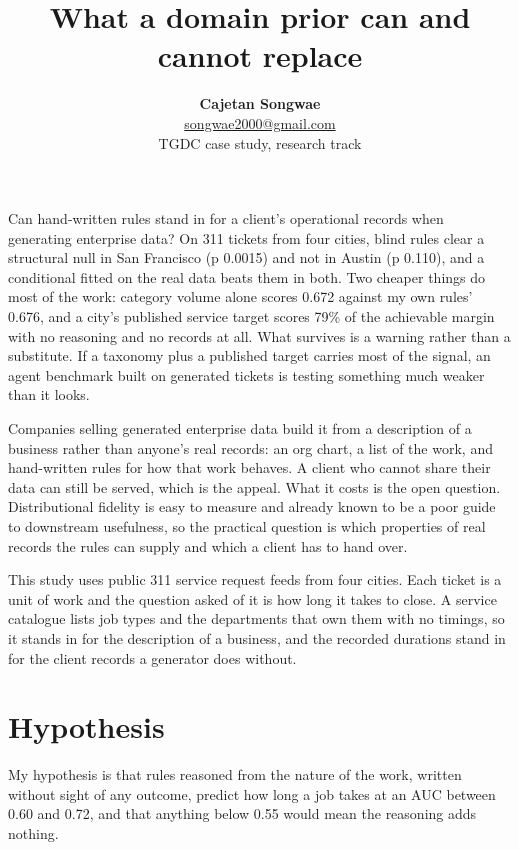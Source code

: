 \documentclass[10pt,a4paper,twocolumn]{article}
\title{\vspace{-1.0em}\textbf{What a domain prior can and cannot replace}\vspace{-0.4em}}
\author{\textbf{Cajetan Songwae} \\
  \small{\href{mailto:songwae2000@gmail.com}{songwae2000@gmail.com}} \\
  \small{TGDC case study, research track}}
\date{}
\begin{document}
\twocolumn[
  \begin{@twocolumnfalse}
  \maketitle
  \vspace{-2.0em}
  \end{@twocolumnfalse}
]

Can hand-written rules stand in for a client's operational records when
generating enterprise data? On 311 tickets from four cities, blind rules clear a
structural null in San Francisco (p 0.0015) and not in Austin (p 0.110), and a
conditional fitted on the real data beats them in both. Two cheaper things do
most of the work: category volume alone scores 0.672 against my own rules' 0.676,
and a city's published service target scores 79\% of the achievable margin with no
reasoning and no records at all. What survives is a warning rather than a
substitute. If a taxonomy plus a published target carries most of the signal, an
agent benchmark built on generated tickets is testing something much weaker than
it looks.

Companies selling generated enterprise data build it from a description of a
business rather than anyone's real records: an org chart, a list of the work, and
hand-written rules for how that work behaves. A client who cannot share their
data can still be served, which is the appeal. What it costs is the open
question. Distributional fidelity is easy to measure and already known to be a
poor guide to downstream usefulness, so the practical question is which
properties of real records the rules can supply and which a client has to hand
over.

This study uses public 311 service request feeds from four cities. Each ticket is
a unit of work and the question asked of it is how long it takes to close. A
service catalogue lists job types and the departments that own them with no
timings, so it stands in for the description of a business, and the recorded
durations stand in for the client records a generator does without.

\section*{Hypothesis}

My hypothesis is that rules reasoned from the nature of the work, written
without sight of any outcome, predict how long a job takes at an AUC between
0.60 and 0.72, and that anything below 0.55 would mean the reasoning adds
nothing.
\end{document}
